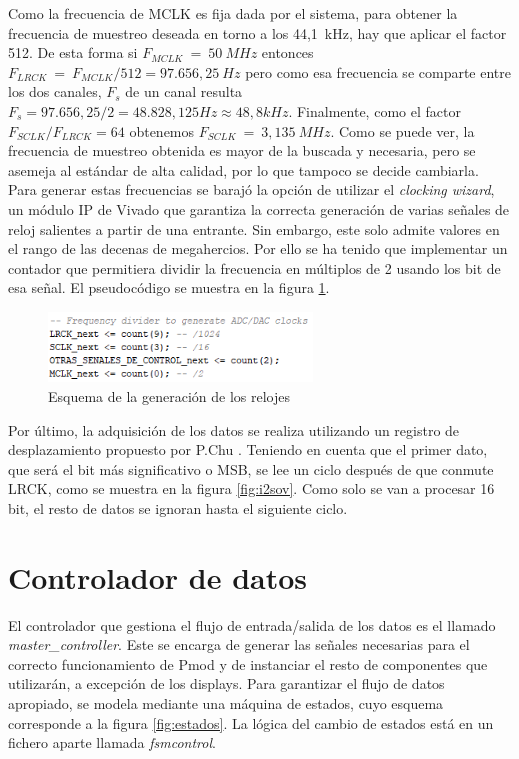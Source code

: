 Como la frecuencia de MCLK es fija dada por el sistema, para obtener la frecuencia de muestreo deseada en torno a los 44,1~kHz, hay que aplicar el factor 512. De esta forma si $F_{MCLK}~=~50~MHz$ entonces $F_{LRCK}~=~F_{MCLK}/512 = 97.656,25~Hz$ pero como esa frecuencia se comparte entre los dos canales, $F_{s}$ de un canal resulta $F_{s} = 97.656,25/2 = 48.828,125 Hz \approx 48,8 kHz$. Finalmente, como el factor $F_{SCLK}/F_{LRCK}=64$ obtenemos $F_{SCLK}~=~3,135~MHz$. Como se puede ver, la frecuencia de muestreo obtenida es mayor de la buscada y necesaria, pero se asemeja al estándar de alta calidad, por lo que tampoco se decide cambiarla. Para generar estas frecuencias se barajó la opción de utilizar el \emph{clocking wizard}, un módulo IP de Vivado que garantiza la correcta generación de varias señales de reloj salientes a partir de una entrante. Sin embargo, este solo admite valores en el rango de las decenas de megahercios. Por ello se ha tenido que implementar un contador que permitiera dividir la frecuencia en múltiplos de 2 usando los bit de esa señal. El pseudocódigo se muestra en la figura \ref{fig:controlsig}.

\begin{figure}[!h]
\begin{center}
\includegraphics[width=7cm]{img/controlsig.png}
\caption{\label{fig:controlsig}Esquema de la generación de los relojes}
\end{center}
\end{figure}

Por último, la adquisición de los datos se realiza utilizando un registro de desplazamiento propuesto por P.Chu \cite{vhdlchu}. Teniendo en cuenta que el primer dato, que será el bit más significativo o MSB, se lee un ciclo después de que conmute LRCK, como se muestra en la figura \ref{fig:i2sov}. Como solo se van a procesar 16 bit, el resto de datos se ignoran hasta el siguiente ciclo.

\section{Controlador de datos}

El controlador que gestiona el flujo de entrada/salida de los datos es el llamado \emph{master\_controller}. Este se encarga de generar las señales necesarias para el correcto funcionamiento de Pmod y de instanciar el resto de componentes que utilizarán, a excepción de los displays. Para garantizar el flujo de datos apropiado, se modela mediante una máquina de estados, cuyo esquema corresponde a la figura \ref{fig:estados}. La lógica del cambio de estados está en un fichero aparte llamada \emph{fsm\-control}.

